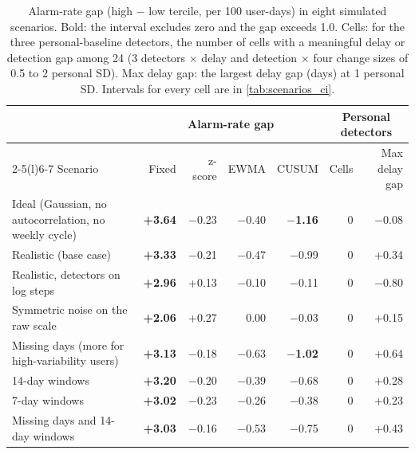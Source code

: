 \begin{table}[t]
\centering
\small
\caption{Alarm-rate gap (high $-$ low tercile, per 100 user-days) in eight simulated scenarios. Bold: the interval excludes zero and the gap exceeds 1.0. Cells: for the three personal-baseline detectors, the number of cells with a meaningful delay or detection gap among 24 (3 detectors $\times$ delay and detection $\times$ four change sizes of 0.5 to 2 personal SD). Max delay gap: the largest delay gap (days) at 1 personal SD. Intervals for every cell are in \cref{tab:scenarios_ci}.}
\label{tab:scenarios}
\begin{tabular}{@{}p{5.2cm}rrrrrr@{}}
\toprule
 & \multicolumn{4}{c}{Alarm-rate gap} & \multicolumn{2}{c}{Personal detectors} \\
\cmidrule(lr){2-5}\cmidrule(l){6-7}
Scenario & Fixed & z-score & EWMA & CUSUM & Cells & Max delay gap \\
\midrule
Ideal (Gaussian, no autocorrelation, no weekly cycle) & \textbf{+3.64} & $-$0.23 & $-$0.40 & \textbf{$-$1.16} & 0 & $-$0.08 \\
Realistic (base case) & \textbf{+3.33} & $-$0.21 & $-$0.47 & $-$0.99 & 0 & +0.34 \\
Realistic, detectors on log steps & \textbf{+2.96} & +0.13 & $-$0.10 & $-$0.11 & 0 & $-$0.80 \\
Symmetric noise on the raw scale & \textbf{+2.06} & +0.27 & 0.00 & $-$0.03 & 0 & +0.15 \\
Missing days (more for high-variability users) & \textbf{+3.13} & $-$0.18 & $-$0.63 & \textbf{$-$1.02} & 0 & +0.64 \\
14-day windows & \textbf{+3.20} & $-$0.20 & $-$0.39 & $-$0.68 & 0 & +0.28 \\
7-day windows & \textbf{+3.02} & $-$0.23 & $-$0.26 & $-$0.38 & 0 & +0.23 \\
Missing days and 14-day windows & \textbf{+3.03} & $-$0.16 & $-$0.53 & $-$0.75 & 0 & +0.43 \\
\bottomrule
\end{tabular}
\end{table}
